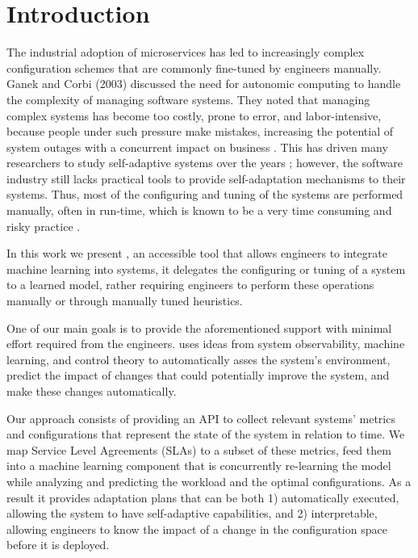 \section{Introduction}

The industrial adoption of microservices has led to increasingly complex configuration schemes that are commonly fine-tuned by engineers manually. Ganek and Corbi (2003) discussed the need for autonomic computing to handle the complexity of managing software systems. They noted that managing complex systems has become too costly, prone to error, and labor-intensive, because people under such pressure make mistakes, increasing the potential of system outages with a concurrent impact on business \cite{ganek_dawning_2003}. This has driven many researchers to study self-adaptive systems over the years \cite{porter_rex:_2016, andrew_pavlo_self-driving_2017, salehie_self-adaptive_2009, ganapathi_predicting_2009, herbst_self-adaptive_2014, faniyi_architecting_2014}; however, the software industry still lacks practical tools to provide self-adaptation mechanisms to their systems. Thus, most of the configuring and tuning of the systems are performed manually, often in run-time, which is known to be a very time consuming and risky practice \cite{ganek_dawning_2003, using_prob_reasoning_automate_software_tuning, de_lemos_software_2013}.


In this work we present \projectname{}, an accessible tool that allows engineers to integrate machine learning into systems, it delegates the configuring or tuning of a system to a learned model, rather requiring engineers to perform these operations manually or through manually tuned heuristics.

One of our main goals is to provide the aforementioned support with minimal effort required from the engineers. \projectname{} uses ideas from system observability, machine learning, and control theory to automatically asses the system's environment, predict the impact of changes that could potentially improve the system, and make these changes automatically.

Our approach consists of providing an API to collect relevant systems' metrics and configurations that represent the state of the system in relation to time. We map Service Level Agreements (SLAs) to a subset of these metrics, feed them into a machine learning component that is concurrently re-learning the model while analyzing and predicting the workload and the optimal configurations. As a result it provides adaptation plans that can be both 1) automatically executed, allowing the system to have self-adaptive capabilities, and 2) interpretable, allowing engineers to know the impact of a change in the configuration space before it is deployed.

